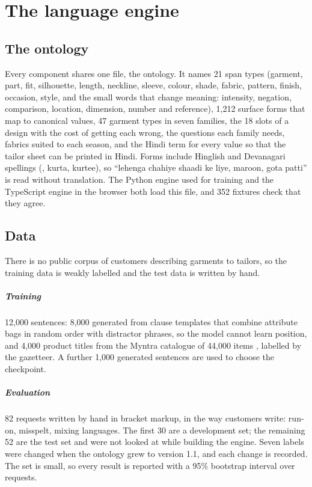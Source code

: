 \chapter{The language engine}\label{ch:language}

\section{The ontology}
Every component shares one file, the ontology. It names 21 span types (garment, part, fit, silhouette, length, neckline, sleeve, colour, shade, fabric, pattern, finish, occasion, style, and the small words that change meaning: intensity, negation, comparison, location, dimension, number and reference), 1,212 surface forms that map to canonical values, 47 garment types in seven families, the 18 slots of a design with the cost of getting each wrong, the questions each family needs, fabrics suited to each season, and the Hindi term for every value so that the tailor sheet can be printed in Hindi. Forms include Hinglish and Devanagari spellings (, kurta, kurtee), so ``lehenga chahiye shaadi ke liye, maroon, gota patti'' is read without translation. The Python engine used for training and the TypeScript engine in the browser both load this file, and 352 fixtures check that they agree.

\section{Data}
There is no public corpus of customers describing garments to tailors, so the training data is weakly labelled and the test data is written by hand.

\paragraph{Training} 12,000 sentences: 8,000 generated from clause templates that combine attribute bags in random order with distractor phrases, so the model cannot learn position, and 4,000 product titles from the Myntra catalogue of 44,000 items \cite{aggarwal2019myntra}, labelled by the gazetteer. A further 1,000 generated sentences are used to choose the checkpoint.

\paragraph{Evaluation} 82 requests written by hand in bracket markup, in the way customers write: run-on, misspelt, mixing languages. The first 30 are a development set; the remaining 52 are the test set and were not looked at while building the engine. Seven labels were changed when the ontology grew to version 1.1, and each change is recorded. The set is small, so every result is reported with a 95\% bootstrap interval over requests.

